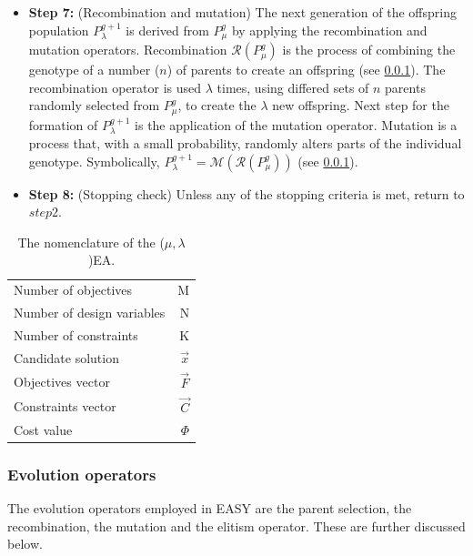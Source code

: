 \begin{itemize}
\item[]{\bf Step 7:}  (Recombination and mutation) The next generation of the offspring population $P_{\lambda}^{g+1}$ is derived from 
$P_{\mu}^{g}$  by applying the recombination and mutation operators. Recombination $\mathcal{R}(P_{\mu}^{g})$ is the process of combining the genotype of a number ($n$) of parents to create an offspring (see \ref{evOps}). The recombination operator is used $\lambda$ times, using differed sets of $n$ parents randomly selected from $P_{\mu}^{g}$,  to create the $\lambda$ new offspring. Next step for the formation of $P_{\lambda}^{g+1}$ is the application of the mutation operator. Mutation is a process that, with a small probability, randomly alters parts of the individual genotype. Symbolically, $P_{\lambda}^{g+1} = \mathcal{M}(\mathcal{R}(P_{\mu}^{g}))$ (see \ref{evOps}).
\item[]{\bf Step 8:}  (Stopping check) Unless any of the stopping criteria is met, return to $step 2$.
\end{itemize}

\begin{table}[htdp]
\centering
\begin{tabular}{lr} 
\hline
\hline
Number of objectives & M\\
Number of design variables & N\\
Number of constraints   & K\\
\hline
Candidate solution   & $\vec{x}$\\
Objectives vector  & $\vec{F}$\\
Constraints vector  & $\vec{C}$\\
Cost value & $\Phi$ \\
\hline
\hline
\end{tabular}
\caption[GEA nomenclature]{The nomenclature of the ($\mu,\lambda$)EA.}
\label{GEA nomenclature} 
\end{table}


\subsubsection{Evolution operators}
\label{evOps}
The evolution operators employed in EASY are the parent selection, the recombination, the mutation and the elitism operator. These are further discussed below. 
   

